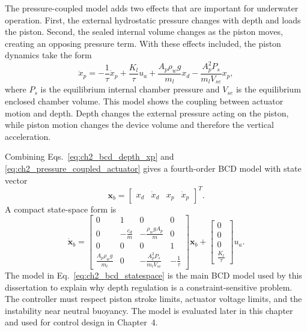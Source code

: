 \documentclass{uhcoethesis}
\begin{document}
The pressure-coupled model adds two effects that are important for underwater operation. First, the external hydrostatic pressure changes with depth and loads the piston. Second, the sealed internal volume changes as the piston moves, creating an opposing pressure term. With these effects included, the piston dynamics take the form
\begin{equation}
    \ddot{x}_p =
    -\frac{1}{\tau}\dot{x}_p
    + \frac{K_l}{\tau}u_a
    + \frac{A_p \rho_w g}{m_l}x_d
    - \frac{A_p^2 P_s}{m_l V_{se}}x_p ,
    \label{eq:ch2_pressure_coupled_actuator}
\end{equation}
where $P_s$ is the equilibrium internal chamber pressure and $V_{se}$ is the equilibrium enclosed chamber volume. This model shows the coupling between actuator motion and depth. Depth changes the external pressure acting on the piston, while piston motion changes the device volume and therefore the vertical acceleration.

Combining Eqs.~\eqref{eq:ch2_bcd_depth_xp} and \eqref{eq:ch2_pressure_coupled_actuator} gives a fourth-order BCD model with state vector
\begin{equation}
    \mathbf{x}_b =
    \begin{bmatrix}
        x_d & \dot{x}_d & x_p & \dot{x}_p
    \end{bmatrix}^T .
    \label{eq:ch2_bcd_state}
\end{equation}
A compact state-space form is
\begin{equation}
    \dot{\mathbf{x}}_b =
    \begin{bmatrix}
        0 & 1 & 0 & 0 \\
        0 & -\frac{c_d}{m} & -\frac{\rho_w g A_p}{m} & 0 \\
        0 & 0 & 0 & 1 \\
        \frac{A_p \rho_w g}{m_l} & 0 &
        -\frac{A_p^2 P_s}{m_l V_{se}} & -\frac{1}{\tau}
    \end{bmatrix}
    \mathbf{x}_b
    +
    \begin{bmatrix}
        0 \\ 0 \\ 0 \\ \frac{K_l}{\tau}
    \end{bmatrix}u_a .
    \label{eq:ch2_bcd_statespace}
\end{equation}
The model in Eq.~\eqref{eq:ch2_bcd_statespace} is the main BCD model used by this dissertation to explain why depth regulation is a constraint-sensitive problem. The controller must respect piston stroke limits, actuator voltage limits, and the instability near neutral buoyancy. The model is evaluated later in this chapter and used for control design in Chapter~4.
\end{document}
